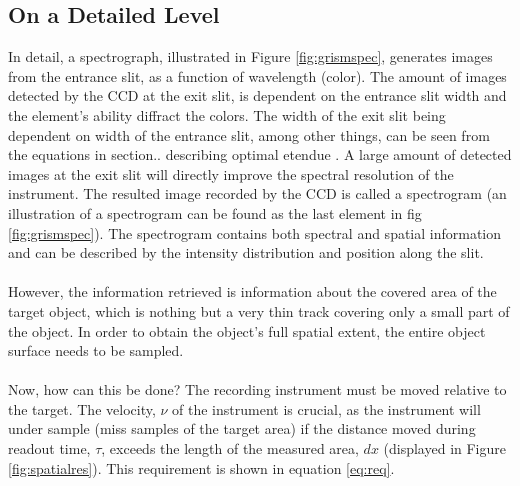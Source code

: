 \subsection{On a Detailed Level}
In detail, a spectrograph, illustrated in Figure \ref{fig:grismspec}, generates images from the entrance slit, as a function of wavelength (color). The amount of images detected by the CCD at the exit slit, is dependent on the entrance slit width and the element’s ability diffract the colors. The width of the exit slit being dependent on width of the entrance slit, among other things, can be seen from the equations in section.. describing optimal etendue . A large amount of detected images at the exit slit will directly improve the spectral resolution of the instrument. The resulted image recorded by the CCD is called a spectrogram (an illustration of a spectrogram can be found as the last element in fig \ref{fig:grismspec}). The spectrogram contains both spectral and spatial information and can be described by the intensity distribution and position along the slit. 
\\\\
However, the information retrieved is information about the covered area of the target object, which is nothing but a very thin track covering only a small part of the object. In order to obtain the object's full spatial extent, the entire object surface needs to be sampled. 
\\\\
Now, how can this be done? The recording instrument must be moved relative to the target. The velocity, $\nu$ of the instrument is crucial, as the instrument will under sample (miss samples of the target area) if the distance moved during readout time, $\tau$, exceeds the length of the measured area, $dx$ (displayed in Figure \ref{fig:spatialres}). This requirement is shown in equation \ref{eq:req}.

